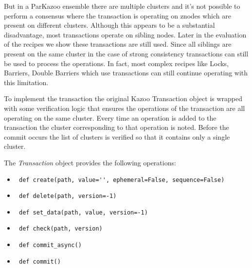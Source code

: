 But in a ParKazoo ensemble there are multiple clusters and it's not possible to perform a consensus where the transaction is operating on znodes which are present on different clusters. Although this appears to be a substantial disadvantage, most transactions operate on sibling nodes. Later in the evaluation of the recipes we show these transactions are still used. Since all siblings are present on the same cluster in the case of strong consistency transactions can still be used to process the operations. In fact, most complex recipes like Locks, Barriers, Double Barriers which use transactions can still continue operating with this limitation.
    
To implement the transaction the original Kazoo Transaction object is wrapped with some verification logic that ensures the operations of the transaction are all operating on the same cluster. Every time an operation is added to the transaction the cluster corresponding to that operation is noted. Before the commit occurs the list of clusters is verified so that it contains only a single cluster.
    
The \textit{Transaction} object provides the following operations:
\begin{itemize}
	\item \lstinline | def create(path, value='', ephemeral=False, sequence=False) |
	\item \lstinline | def delete(path, version=-1) |
	\item \lstinline | def set_data(path, value, version=-1) |
	\item \lstinline | def check(path, version) |
	\item \lstinline | def commit_async() |
	\item \lstinline | def commit() |
\end{itemize}